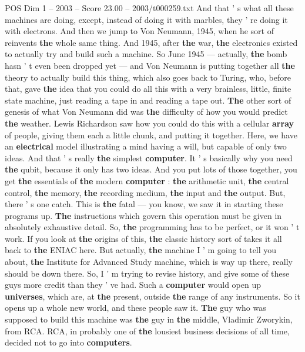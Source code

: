 \begin{textsample}{POS Dim 1 – 2003 – Score 23.00 – 2003/t000259.txt}
And that ' s what all these machines are doing, except, instead of doing it with marbles, they ' re doing it with electrons.
And then we jump to Von Neumann, 1945, when he sort of reinvents \textbf{the} whole same thing.
And 1945, after \textbf{the} war, \textbf{the} electronics existed to actually try and build such a machine.
So June 1945 — actually, \textbf{the} bomb hasn ' t even been dropped yet — and Von Neumann is putting together all \textbf{the} theory to actually build this thing, which also goes back to Turing, who, before that, gave \textbf{the} idea that you could do all this with a very brainless, little, finite state machine, just reading a tape in and reading a tape out. \textbf{The} other sort of genesis of what Von Neumann did was \textbf{the} difficulty of how you would predict \textbf{the} weather.
Lewis Richardson saw how you could do this with a cellular \textbf{array} of people, giving them each a little chunk, and putting it together.
Here, we have an \textbf{electrical} model illustrating a mind having a will, but capable of only two ideas.
And that ' s really \textbf{the} simplest \textbf{computer}.
It ' s basically why you need \textbf{the} qubit, because it only has two ideas.
And you put lots of those together, you get \textbf{the} essentials of \textbf{the} modern \textbf{computer} : \textbf{the} arithmetic unit, \textbf{the} central control, \textbf{the} memory, \textbf{the} recording medium, \textbf{the} input and \textbf{the} output.
But, there ' s one catch.
This is \textbf{the} fatal — you know, we saw it in starting these programs up. \textbf{The} instructions which govern this operation must be given in absolutely exhaustive detail.
So, \textbf{the} programming has to be perfect, or it won ' t work.
If you look at \textbf{the} origins of this, \textbf{the} classic history sort of takes it all back to \textbf{the} ENIAC here.
But actually, \textbf{the} machine I ' m going to tell you about, \textbf{the} Institute for Advanced Study machine, which is way up there, really should be down there.
So, I ' m trying to revise history, and give some of these guys more credit than they ' ve had.
Such a \textbf{computer} would open up \textbf{universes}, which are, at \textbf{the} present, outside \textbf{the} range of any instruments.
So it opens up a whole new world, and these people saw it. \textbf{The} guy who was supposed to build this machine was \textbf{the} guy in \textbf{the} middle, Vladimir Zworykin, from RCA.
RCA, in probably one of \textbf{the} lousiest business decisions of all time, decided not to go into \textbf{computers}.

\end{textsample}
